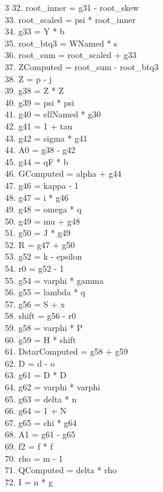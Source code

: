 \documentclass[10pt]{article}
\begin{document}
\begin{multicols}{3}
32. root\_inner = g31 - root\_skew\\
33. root\_scaled = psi * root\_inner\\
34. g33 = Y * b\\
35. root\_btq3 = WNamed * s\\
36. root\_sum = root\_scaled + g33\\
37. ZComputed = root\_sum - root\_btq3\\
38. Z = p - j\\
39. g38 = Z * Z\\
40. g39 = psi * psi\\
41. g40 = ellNamed * g30\\
42. g41 = 1 + tau\\
43. g42 = sigma * g41\\
44. A0 = g38 - g42\\
45. g44 = qF * b\\
46. GComputed = alpha + g44\\
47. g46 = kappa - 1\\
48. g47 = i * g46\\
49. g48 = omega * q\\
50. g49 = mu + g48\\
51. g50 = J * g49\\
52. R = g47 + g50\\
53. g52 = k - epsilon\\
54. r0 = g52 - 1\\
55. g54 = varphi * gamma\\
56. g55 = lambda * q\\
57. g56 = S + x\\
58. shift = g56 - r0\\
59. g58 = varphi * P\\
60. g59 = H * shift\\
61. DstarComputed = g58 + g59\\
62. D = d - o\\
63. g61 = D * D\\
64. g62 = varphi * varphi\\
65. g63 = delta * n\\
66. g64 = 1 + N\\
67. g65 = chi * g64\\
68. A1 = g61 - g65\\
69. f2 = f * f\\
70. rho = m - 1\\
71. QComputed = delta * rho\\
72. I = n * g\\

\end{multicols}
\end{document}
